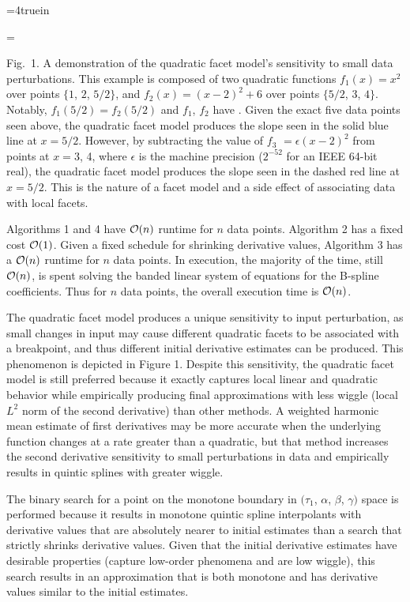\topinsert
\centerline{\epsfxsize=4truein }
{\everymath={\scriptstyle}

\narrower\noindent\rmVIII Fig.\ 1. A demonstration of the quadratic
  facet model's sensitivity to small data perturbations. This example is
  composed of two quadratic functions $f_1(x) = x^2$ over points $\{1$,
  $2$, $5/2\}$, and $f_2(x) = (x-2)^2 + 6$ over points $\{5/2$, $3$,
  $4\}$. Notably, $f_1(5/2) = f_2(5/2)$ and $f_1$, $f_2$ have
  . Given the exact five data points
  seen above, the quadratic facet model produces the slope seen in the
  solid blue line at $x = 5/2$. However, by subtracting the value of
  $f_3$ $= \epsilon(x-2)^2$ from points at $x = 3$, 4, where $\epsilon$
  is the machine precision ($2^{-52}$ for an IEEE 64-bit real), the
  quadratic facet model produces the slope seen in the dashed red line
  at $x = 5/2$. This is the nature of a facet model and a side effect
  of associating data with local facets.
\par} \endinsert


Algorithms 1 and 4 have ${\cal O}(n)$ runtime for $n$ data
points. Algorithm 2 has a fixed cost ${\cal O}(1)$. Given a fixed
schedule for shrinking derivative values, Algorithm 3 has a ${\cal
  O}(n)$ runtime for $n$ data points. In execution, the majority of
the time, still ${\cal O}(n)$, is spent solving the banded linear
system of equations for the B-spline coefficients. Thus for $n$ data
points, the overall execution time is ${\cal O}(n)$.

The quadratic facet model produces a unique sensitivity to input
perturbation, as small changes in input may cause different quadratic
facets to be associated with a breakpoint, and thus different initial
derivative estimates can be produced. This phenomenon is depicted in
Figure 1. Despite this sensitivity, the quadratic facet model is still
preferred because it exactly captures local linear and quadratic
behavior while empirically producing final approximations with less
wiggle (local $L^2$ norm of the second derivative) than other methods. A
weighted harmonic mean estimate of first derivatives may be more
accurate when the underlying function changes at a rate greater than a
quadratic, but that method increases the second derivative sensitivity
to small perturbations in data and empirically results in quintic
splines with greater wiggle.

The binary search for a point on the monotone boundary in $(\tau_1$,
$\alpha$, $\beta$, $\gamma)$ space is performed because it results in
monotone quintic spline interpolants with derivative values that are
absolutely nearer to initial estimates than a search that strictly
shrinks derivative values. Given that the initial derivative estimates
have desirable properties (capture low-order phenomena and are low
wiggle), this search results in an approximation that is both monotone
and has derivative values similar to the initial estimates.

